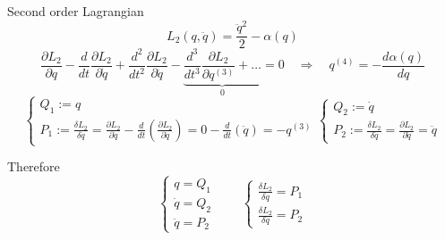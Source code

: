 \begin{frame}{Second order Lagrangian}
  \begin{equation*}
    L_2(q, \ddot{q}) = \frac{\ddot{q}^2}{2} - \alpha(q)
  \end{equation*}
  \vspace{0.2em}
  \begin{equation*} \label{eq: second-order_motion_eq_lagr}
    \frac{\partial L_2}{\partial q} -
    \frac{d}{dt}\frac{\partial L_2}{\partial \dot{q}} +
    \frac{d^2}{dt^2}\frac{\partial L_2}{\partial \ddot{q}} -
    \underbrace{
      \frac{d^3}{dt^3}\frac{\partial L_2}{\partial q^{(3)}} + \ldots
    }_0 = 0
    \quad \Rightarrow \quad
    q^{(4)} = - \frac{d\alpha(q)}{dq}
  \end{equation*}
  \begin{equation*}
    \begin{cases}
      Q_1 := q \\
      P_1 := \frac{\delta L_2}{\delta \dot{q}}
           = \frac{\partial L_2}{\partial \dot{q}} -
             \frac{d}{dt} \left( \frac{\partial L_2}{\partial \ddot{q}} \right)
           = 0 - \frac{d}{dt} \left( \ddot{q} \right) = -q^{(3)}
    \end{cases}
    \begin{cases}
      Q_2 := \dot{q} \\
      P_2 := \frac{\delta L_2}{\delta \ddot{q}}
           = \frac{\partial L_2}{\partial \ddot{q}} = \ddot{q}
    \end{cases}
  \end{equation*}

  Therefore
  \begin{equation*}
    \begin{cases}
      q        = Q_1 \\
      \dot{q}  = Q_2 \\
      \ddot{q} = P_2
    \end{cases}
    \qquad
    \begin{cases}
      \frac{\delta L_2}{\delta \dot{q}}  = P_1 \\
      \frac{\delta L_2}{\delta \ddot{q}} = P_2
    \end{cases}
  \end{equation*}
\end{frame}

